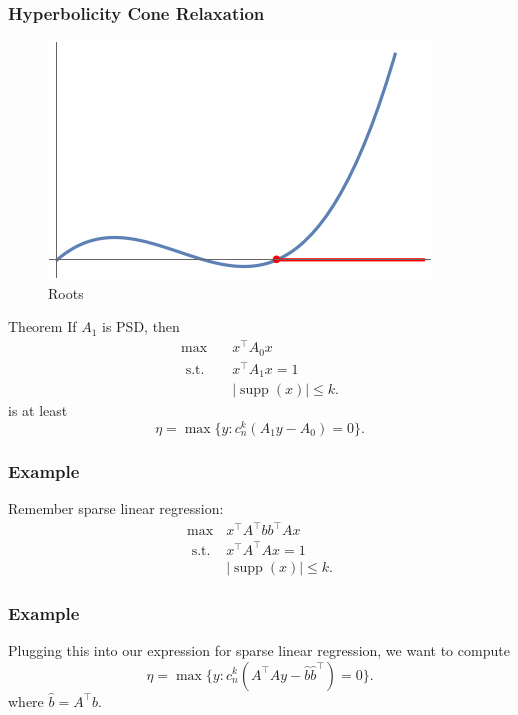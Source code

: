 \documentclass{beamer}
\DeclareMathOperator*{\supp}{supp}
\newcommand{\st}{{\text{ s.t. }}}
\begin{document}
\begin{frame}
    \frametitle{Hyperbolicity Cone Relaxation}
    \begin{figure}[htpb]
        \centering
        \includegraphics[width=0.8\linewidth]{roots.png}
        \caption{Roots}%
        \label{fig:roots}
    \end{figure}
\end{frame}
\begin{frame}
    \begin{block}{Theorem}
        If $A_1$ is PSD, then
        \begin{equation*}
            \begin{aligned}
                \max\quad & x^{\intercal}A_0x\\
                \st & x^{\intercal}A_1x = 1\\
                    &|\supp(x)| \le k.
            \end{aligned}
        \end{equation*}
        is at least 
        \[
            \eta = \max \{y : c_n^k(A_1y-A_0) = 0 \}.
        \]
    \end{block}
\end{frame}
\begin{frame}
    \frametitle{Example}
    Remember sparse linear regression:
    \begin{equation*}
        \begin{aligned}
        \max & x^{\intercal}A^{\intercal}bb^{\intercal}Ax\\
        \st & x^{\intercal}A^{\intercal}Ax = 1\\
            & |\supp(x)| \le k.
        \end{aligned}
    \end{equation*}
\end{frame}
\begin{frame}
    \frametitle{Example}
    Plugging this into our expression for sparse linear regression, we want to compute
    \[
        \eta = \max \{y : c_n^k(A^{\intercal}Ay-\hat{b}\hat{b}^{\intercal}) = 0 \}.
    \]
    where $\hat{b} = A^{\intercal}b$.
\end{frame}
\end{document}
